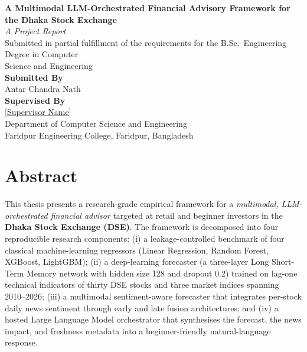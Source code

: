 \documentclass[12pt,a4paper,oneside]{report}
\begin{document}
\begin{titlepage}
  \begin{center}
    \vspace*{0.5cm}

    {\LARGE \textbf{A Multimodal LLM-Orchestrated Financial Advisory Framework for the Dhaka Stock Exchange}}\\[1.5cm]

    {\large \emph{A Project Report}}\\[0.5cm]

    {\normalsize Submitted in partial fulfillment of the requirements for the B.Sc.\ Engineering Degree in Computer\\
    Science and Engineering}\\[2.0cm]

    \textbf{Submitted By}\\[0.3cm]
    Antar Chandra Nath\\[1.5cm]

    \textbf{Supervised By}\\[0.3cm]
    \href{}{[Supervisor Name]}\\[3.0cm]

    {\normalsize Department of Computer Science and Engineering\\
    Faridpur Engineering College, Faridpur, Bangladesh}
  \end{center}
\end{titlepage}

\chapter*{Abstract}

This thesis presents a research-grade empirical framework for a
\emph{multimodal, LLM-orchestrated financial advisor} targeted at
retail and beginner investors in the \textbf{Dhaka Stock Exchange
(DSE)}. The framework is decomposed into four reproducible research
components: (i) a leakage-controlled benchmark of four classical
machine-learning regressors (Linear Regression, Random Forest, XGBoost,
LightGBM); (ii) a deep-learning forecaster (a three-layer Long
Short-Term Memory network with hidden size 128 and dropout 0.2)
trained on lag-one technical indicators of thirty DSE stocks and three
market indices spanning 2010--2026; (iii) a multimodal sentiment-aware
forecaster that integrates per-stock daily news sentiment through early
and late fusion architectures; and (iv) a hosted Large Language Model
orchestrator that synthesises the forecast, the news impact, and
freshness metadata into a beginner-friendly natural-language response.
\end{document}
